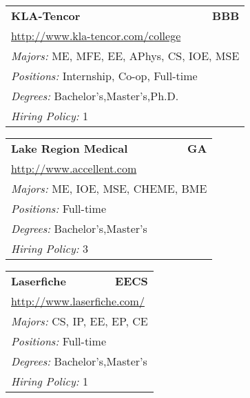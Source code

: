 \documentclass[twoside]{article}
\begin{document}
\begin{center}
\begin{multicols}{3}
\begin{FlushLeft}
\begin{minipage}{.9\columnwidth}
\end{minipage}
 
\begin{minipage}{.9\columnwidth}\begin{tabularx}{.95\columnwidth}{Xr}
                 {\Large\bf KLA-Tencor} & {\Large\bf BBB}\\
    \multicolumn{2}{p{.95\columnwidth}}{\url{http://www.kla-tencor.com/college}}\\
    \multicolumn{2}{p{.95\columnwidth}}{\emph{Majors:} ME, MFE, EE, APhys, CS, IOE, MSE}\\
    \multicolumn{2}{p{.95\columnwidth}}{\emph{Positions:} Internship, Co-op, Full-time}\\
    \multicolumn{2}{p{.95\columnwidth}}{\emph{Degrees:} Bachelor's,Master's,Ph.D.}\\
    \multicolumn{2}{p{.95\columnwidth}}{\emph{Hiring Policy:} 1}\\
    \end{tabularx}
    
\end{minipage}
 
\begin{minipage}{.9\columnwidth}\begin{tabularx}{.95\columnwidth}{Xr}
                 {\Large\bf Lake Region Medical} & {\Large\bf GA}\\
    \multicolumn{2}{p{.95\columnwidth}}{\url{http://www.accellent.com}}\\
    \multicolumn{2}{p{.95\columnwidth}}{\emph{Majors:} ME, IOE, MSE, CHEME, BME}\\
    \multicolumn{2}{p{.95\columnwidth}}{\emph{Positions:} Full-time}\\
    \multicolumn{2}{p{.95\columnwidth}}{\emph{Degrees:} Bachelor's,Master's}\\
    \multicolumn{2}{p{.95\columnwidth}}{\emph{Hiring Policy:} 3}\\
    \end{tabularx}
    
\end{minipage}
 
\begin{minipage}{.9\columnwidth}\begin{tabularx}{.95\columnwidth}{Xr}
                 {\Large\bf Laserfiche} & {\Large\bf EECS}\\
    \multicolumn{2}{p{.95\columnwidth}}{\url{http://www.laserfiche.com/}}\\
    \multicolumn{2}{p{.95\columnwidth}}{\emph{Majors:} CS, IP, EE, EP, CE}\\
    \multicolumn{2}{p{.95\columnwidth}}{\emph{Positions:} Full-time}\\
    \multicolumn{2}{p{.95\columnwidth}}{\emph{Degrees:} Bachelor's,Master's}\\
    \multicolumn{2}{p{.95\columnwidth}}{\emph{Hiring Policy:} 1}\\
    \end{tabularx}
    

\end{minipage}
\end{FlushLeft}
\end{multicols}
\end{center}
\end{document}
